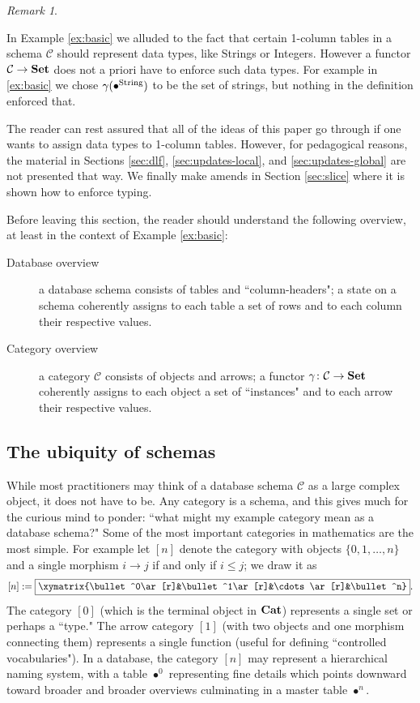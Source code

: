 \documentclass{amsart}
\def\tn{\textnormal}
\def\mc{\mathcal}
\def\to{\rightarrow}
\def\taking{\colon}
\def\Cat{{\bf Cat}}
\def\Set{{\bf Set}}
\def\mcC{\mc{C}}
\theoremstyle{remark}
\newtheorem{remark}[theorem]{Remark}
\theoremstyle{definition}
\begin{document}
\begin{remark}\label{rem:typing}

In Example \ref{ex:basic} we alluded to the fact that certain 1-column tables in a schema $\mcC$ should represent data types, like Strings or Integers.  However a functor $\mcC\to\Set$ does not a priori have to enforce such data types.  For example in \ref{ex:basic} we chose $\gamma(\bullet^{\tn{String}})$ to be the set of strings, but nothing in the definition enforced that. 

The reader can rest assured that all of the ideas of this paper go through if one wants to assign data types to 1-column tables.  However, for pedagogical reasons, the material in Sections \ref{sec:dlf}, \ref{sec:updates-local}, and \ref{sec:updates-global} are not presented that way.  We finally make amends in Section \ref{sec:slice} where it is shown how to enforce typing.

\end{remark}

Before leaving this section, the reader should understand the following overview, at least in the context of Example \ref{ex:basic}:

\begin{description}\item[Database overview] a database schema consists of tables and ``column-headers"; a state on a schema coherently assigns to each table a set of rows and to each column their respective values.\item[Category overview] a category $\mcC$ consists of objects and arrows; a functor $\gamma\taking\mcC\to\Set$ coherently assigns to each object a set of ``instances" and to each arrow their respective values. \end{description}


\subsection{The ubiquity of schemas}

While most practitioners may think of a database schema $\mcC$ as a large complex object, it does not have to be.  Any category is a schema, and this gives much for the curious mind to ponder: ``what might my example category mean as a database schema?"  Some of the most important categories in mathematics are the most simple.  For example let $[n]$ denote the category with objects $\{0,1,\ldots,n\}$ and a single morphism $i\to j$ if and only if $i\leq j$; we draw it as $$[n]:=\fbox{\xymatrix{\bullet^0\ar[r]&\bullet^1\ar[r]&\cdots\ar[r]&\bullet^n}}.$$  The category $[0]$ (which is the terminal object in $\Cat$) represents a single set or perhaps a ``type."  The arrow category $[1]$ (with two objects and one morphism connecting them) represents a single function (useful for defining ``controlled vocabularies").  In a database, the category $[n]$ may represent a hierarchical naming system, with a table $\bullet^0$ representing fine details which points downward toward broader and broader overviews culminating in a master table $\bullet^n$.  
\end{document}
